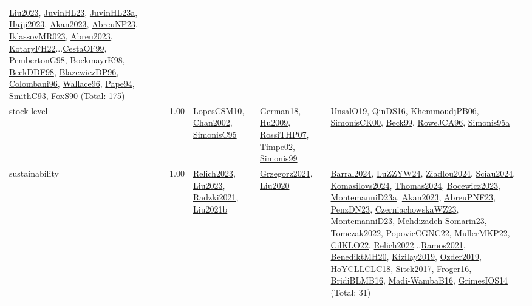 {\begin{longtable}{p{3cm}r>{\raggedright\arraybackslash}p{6cm}>{\raggedright\arraybackslash}p{6cm}>{\raggedright\arraybackslash}p{8cm}}
\hyperref[detail:Liu2023]{Liu2023}, \hyperref[detail:JuvinHL23]{JuvinHL23}, \hyperref[detail:JuvinHL23a]{JuvinHL23a}, \hyperref[detail:Hajji2023]{Hajji2023}, \hyperref[detail:Akan2023]{Akan2023}, \hyperref[detail:AbreuNP23]{AbreuNP23}, \hyperref[detail:IklassovMR023]{IklassovMR023}, \hyperref[detail:Abreu2023]{Abreu2023}, \hyperref[detail:KotaryFH22]{KotaryFH22}...\hyperref[detail:CestaOF99]{CestaOF99}, \hyperref[detail:PembertonG98]{PembertonG98}, \hyperref[detail:BockmayrK98]{BockmayrK98}, \hyperref[detail:BeckDDF98]{BeckDDF98}, \hyperref[detail:BlazewiczDP96]{BlazewiczDP96}, \hyperref[detail:Colombani96]{Colombani96}, \hyperref[detail:Wallace96]{Wallace96}, \hyperref[detail:Pape94]{Pape94}, \hyperref[detail:SmithC93]{SmithC93}, \hyperref[detail:FoxS90]{FoxS90} (Total: 175)\\
\index{stock level}\index{Concepts!stock level}stock level &  1.00 & \hyperref[detail:LopesCSM10]{LopesCSM10}, \hyperref[detail:Chan2002]{Chan2002}, \hyperref[detail:SimonisC95]{SimonisC95} & \hyperref[detail:German18]{German18}, \hyperref[detail:Hu2009]{Hu2009}, \hyperref[detail:RossiTHP07]{RossiTHP07}, \hyperref[detail:Timpe02]{Timpe02}, \hyperref[detail:Simonis99]{Simonis99} & \hyperref[detail:UnsalO19]{UnsalO19}, \hyperref[detail:QinDS16]{QinDS16}, \hyperref[detail:KhemmoudjPB06]{KhemmoudjPB06}, \hyperref[detail:SimonisCK00]{SimonisCK00}, \hyperref[detail:Beck99]{Beck99}, \hyperref[detail:RoweJCA96]{RoweJCA96}, \hyperref[detail:Simonis95a]{Simonis95a}\\
\index{sustainability}\index{Concepts!sustainability}sustainability &  1.00 & \hyperref[detail:Relich2023]{Relich2023}, \hyperref[detail:Liu2023]{Liu2023}, \hyperref[detail:Radzki2021]{Radzki2021}, \hyperref[detail:Liu2021b]{Liu2021b} & \hyperref[detail:Grzegorz2021]{Grzegorz2021}, \hyperref[detail:Liu2020]{Liu2020} & \hyperref[detail:Barral2024]{Barral2024}, \hyperref[detail:LuZZYW24]{LuZZYW24}, \hyperref[detail:Ziadlou2024]{Ziadlou2024}, \hyperref[detail:Sciau2024]{Sciau2024}, \hyperref[detail:Komasilovs2024]{Komasilovs2024}, \hyperref[detail:Thomas2024]{Thomas2024}, \hyperref[detail:Bocewicz2023]{Bocewicz2023}, \hyperref[detail:MontemanniD23a]{MontemanniD23a}, \hyperref[detail:Akan2023]{Akan2023}, \hyperref[detail:AbreuPNF23]{AbreuPNF23}, \hyperref[detail:PenzDN23]{PenzDN23}, \hyperref[detail:CzerniachowskaWZ23]{CzerniachowskaWZ23}, \hyperref[detail:MontemanniD23]{MontemanniD23}, \hyperref[detail:Mehdizadeh-Somarin23]{Mehdizadeh-Somarin23}, \hyperref[detail:Tomczak2022]{Tomczak2022}, \hyperref[detail:PopovicCGNC22]{PopovicCGNC22}, \hyperref[detail:MullerMKP22]{MullerMKP22}, \hyperref[detail:CilKLO22]{CilKLO22}, \hyperref[detail:Relich2022]{Relich2022}...\hyperref[detail:Ramos2021]{Ramos2021}, \hyperref[detail:BenediktMH20]{BenediktMH20}, \hyperref[detail:Kizilay2019]{Kizilay2019}, \hyperref[detail:Ozder2019]{Ozder2019}, \hyperref[detail:HoYCLLCLC18]{HoYCLLCLC18}, \hyperref[detail:Sitek2017]{Sitek2017}, \hyperref[detail:Froger16]{Froger16}, \hyperref[detail:BridiBLMB16]{BridiBLMB16}, \hyperref[detail:Madi-WambaB16]{Madi-WambaB16}, \hyperref[detail:GrimesIOS14]{GrimesIOS14} (Total: 31)\\

\end{longtable}}
